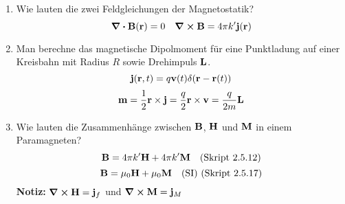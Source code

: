 \documentclass{scrartcl}
\newcommand{\ds}{\displaystyle}
\begin{document}
\begin{enumerate}
    \item Wie lauten die zwei Feldgleichungen der Magnetostatik?
          $$\div \vb B(\vb r) = 0\quad \curl \vb B= 4\pi k'\vb j(\vb r)$$

    \item Man berechne das magnetische Dipolmoment für eine Punktladung auf
          einer Kreisbahn mit Radius $R$ sowie Drehimpuls $\vb L$.
          $$\vb j(\vb r,t)=q\vb v(t)\delta(\vb r-\vb r(t))$$
          $$\vb m = \frac{1}{2}\vb r \times \vb j=\frac{q}{2}\vb 
          r\times\vb v=\frac{q}{2m}\vb L$$

    \item Wie lauten die Zusammenhänge zwischen $\vb B$, $\vb H$ 
          und $\vb M$ in einem Paramagneten?
          $$\vb B = 4\pi k'\vb H + 4\pi k'\vb M\quad\text{(Skript 2.5.12)}$$
          $$\vb B = \mu_0 \vb H + \mu_0 \vb M \quad\text{(SI) 
          (Skript 2.5.17)}$$
          \textbf{Notiz:} $\ds \curl \vb H = \vb j_f$ und 
          $\ds \curl \vb M=\vb j_M$ 

  \end{enumerate}

  \newpage
\end{document}
